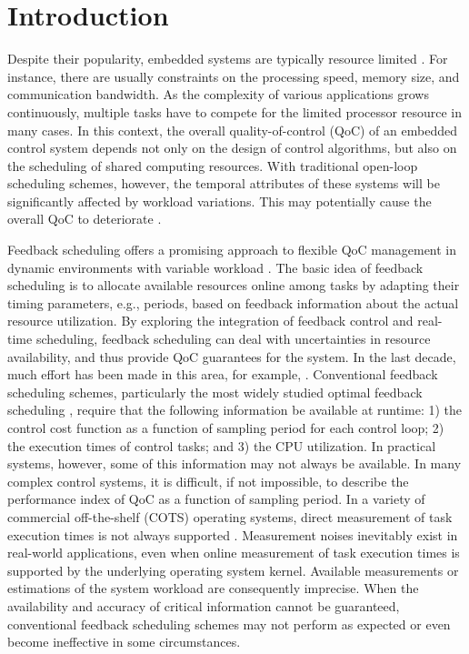 \documentclass[12pt,a4paper]{ijicic}
\begin{document}
\section{Introduction}
Despite their popularity, embedded systems are typically resource
limited \cite{R1,R2,R3}. For instance, there are usually constraints on the
processing speed, memory size, and communication bandwidth. As the complexity of various applications grows
continuously, multiple tasks have to compete for the limited
processor resource in many cases. In this context, the overall
quality-of-control (QoC) of an embedded control system depends not
only on the design of control algorithms, but also on the scheduling
of shared computing resources. With traditional open-loop scheduling
schemes, however, the temporal attributes of these systems will be
significantly affected by workload variations. This may potentially
cause the overall QoC to deteriorate \cite{R4,R5}.

Feedback scheduling offers a promising approach to flexible QoC
management in dynamic environments with variable workload \cite{R1,R3}. The
basic idea of feedback scheduling is to allocate available resources
online among tasks by adapting their timing parameters, e.g.,
periods, based on feedback information about the actual resource
utilization. By exploring the integration of feedback control and
real-time scheduling, feedback scheduling can deal with
uncertainties in resource availability, and thus provide QoC
guarantees for the system. In the last decade, much effort has been
made in this area, for example, \cite{R5,R6,R7,R8,R9,R10,R11,R12,R13,R14,R15}.
Conventional feedback scheduling schemes, particularly the most
widely studied optimal feedback scheduling \cite{R6,R7,R8}, require that the
following information be available at runtime: 1) the control cost
function as a function of sampling period for each control loop; 2)
the execution times of control tasks; and 3) the CPU utilization. In
practical systems, however, some of this information may not always
be available. In many complex control systems, it is difficult, if
not impossible, to describe the performance index of QoC as a
function of sampling period. In a variety of
commercial off-the-shelf (COTS) operating systems, direct
measurement of task execution times is not always supported \cite{R12}.
Measurement noises inevitably exist in real-world applications, even
when online measurement of task execution times is supported by the
underlying operating system kernel. Available measurements or
estimations of the system workload are consequently imprecise. When
the availability and accuracy of critical information cannot be
guaranteed, conventional feedback scheduling schemes may not perform
as expected or even become ineffective in some circumstances.
\end{document}
